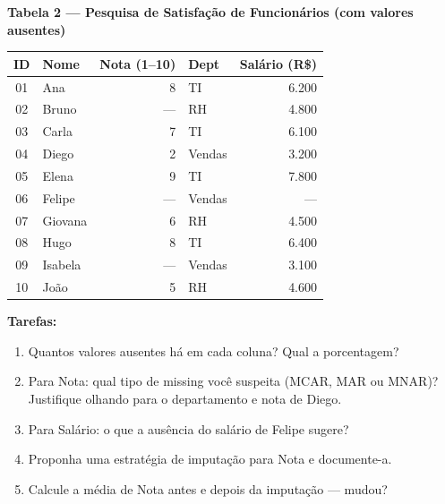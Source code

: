 \begin{BoardBox}
\textbf{Tabela 2 — Pesquisa de Satisfação de Funcionários (com valores ausentes)}

\medskip
\begin{tabular}{|c|l|r|l|r|}
\hline
\textbf{ID} & \textbf{Nome} & \textbf{Nota (1–10)} & \textbf{Dept} & \textbf{Salário (R\$)} \\
\hline
01 & Ana     & 8    & TI      & 6.200 \\
02 & Bruno   & ---  & RH      & 4.800 \\
03 & Carla   & 7    & TI      & 6.100 \\
04 & Diego   & 2    & Vendas  & 3.200 \\
05 & Elena   & 9    & TI      & 7.800 \\
06 & Felipe  & ---  & Vendas  & ---   \\
07 & Giovana & 6    & RH      & 4.500 \\
08 & Hugo    & 8    & TI      & 6.400 \\
09 & Isabela & ---  & Vendas  & 3.100 \\
10 & João    & 5    & RH      & 4.600 \\
\hline
\end{tabular}

\medskip
\textbf{Tarefas:}
\begin{enumerate}
  \item Quantos valores ausentes há em cada coluna? Qual a porcentagem?
  \item Para Nota: qual tipo de missing você suspeita (MCAR, MAR ou MNAR)?
  Justifique olhando para o departamento e nota de Diego.
  \item Para Salário: o que a ausência do salário de Felipe sugere?
  \item Proponha uma estratégia de imputação para Nota e documente-a.
  \item Calcule a média de Nota antes e depois da imputação — mudou?
\end{enumerate}


\end{BoardBox}
